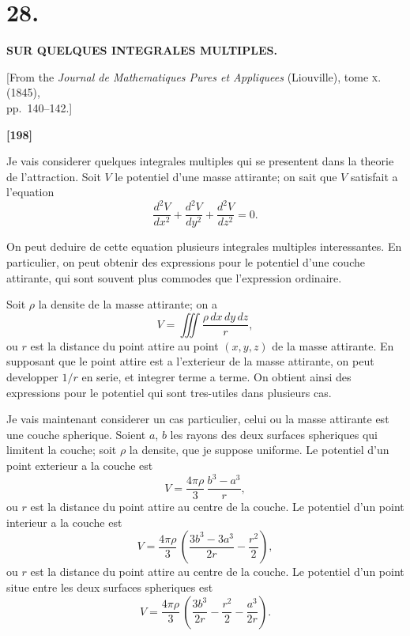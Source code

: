 \documentclass[11pt,a4paper]{article}
\begin{document}
\newpage
\section*{28.}

\begin{center}
\textbf{SUR QUELQUES INTEGRALES MULTIPLES.}
\end{center}

\begin{center}
[From the \textit{Journal de Mathematiques Pures et Appliquees} (Liouville), tome \textsc{x}. (1845),\\
pp.~140--142.]
\end{center}


\textbf{[198]}

Je vais considerer quelques integrales multiples qui se presentent dans la theorie
de l'attraction. Soit $V$ le potentiel d'une masse attirante; on sait que $V$ satisfait a
l'equation
\[\frac{d^2V}{dx^2} + \frac{d^2V}{dy^2} + \frac{d^2V}{dz^2} = 0.\]

On peut deduire de cette equation plusieurs integrales multiples interessantes. En
particulier, on peut obtenir des expressions pour le potentiel d'une couche attirante, qui
sont souvent plus commodes que l'expression ordinaire.

Soit $\rho$ la densite de la masse attirante; on a
\[V = \iiint \frac{\rho\, dx\, dy\, dz}{r},\]
ou $r$ est la distance du point attire au point $(x, y, z)$ de la masse attirante. En supposant
que le point attire est a l'exterieur de la masse attirante, on peut developper $1/r$ en
serie, et integrer terme a terme. On obtient ainsi des expressions pour le potentiel qui
sont tres-utiles dans plusieurs cas.

Je vais maintenant considerer un cas particulier, celui ou la masse attirante est une
couche spherique. Soient $a$, $b$ les rayons des deux surfaces spheriques qui limitent la
couche; soit $\rho$ la densite, que je suppose uniforme. Le potentiel d'un point exterieur a la
couche est
\[V = \frac{4\pi\rho}{3}\, \frac{b^3 - a^3}{r},\]
ou $r$ est la distance du point attire au centre de la couche. Le potentiel d'un point
interieur a la couche est
\[V = \frac{4\pi\rho}{3}\, \left(\frac{3b^3 - 3a^3}{2r} - \frac{r^2}{2}\right),\]
ou $r$ est la distance du point attire au centre de la couche. Le potentiel d'un point situe
entre les deux surfaces spheriques est
\[V = \frac{4\pi\rho}{3}\, \left(\frac{3b^3}{2r} - \frac{r^2}{2} - \frac{a^3}{2r}\right).\]
\end{document}
